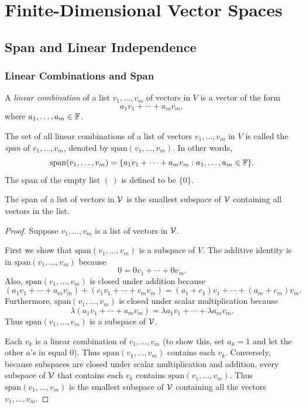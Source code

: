 \section{Finite-Dimensional Vector Spaces}

\subsection{Span and Linear Independence}
\subsubsection{Linear Combinations and Span}
\begin{definition}
	A \textit{linear combination} of a list $v_1, \dots, v_m$ of vectors in $V$ is a vector of the form
	\[
	a_1v_1 + \cdots + a_mv_m,
	\]
	where $a_1, \dots, a_m \in \mathbb{F}$.
\end{definition}
\begin{definition}[Span]
	The set of all linear combinations of a list of vectors $v_1, \dots, v_m$ in $V$ is called the \textit{span} of $v_1, \dots, v_m$, denoted by $\text{span}(v_1, \dots, v_m)$. In other words,
	\[
	\text{span}(v_1, \dots, v_m) = \{a_1v_1 + \cdots + a_mv_m : a_1, \dots, a_m \in \mathbb{F}\}.
	\]
	The span of the empty list $( \, )$ is defined to be $\{0\}$.
\end{definition}
\begin{theorem}
	The span of a list of vectors in $\mathcal{V}$ is the smallest subspace of $\mathcal{V}$ containing all vectors in the list.
\end{theorem}
\begin{proof}
	Suppose $v_1, \dots, v_m$ is a list of vectors in $\mathcal{V}$.
	
	First we show that $\text{span}(v_1, \dots, v_m)$ is a subspace of $V$. The additive identity is in $\text{span}(v_1, \dots, v_m)$ because
	\[
	0 = 0v_1 + \cdots + 0v_m.
	\]
	Also, $\text{span}(v_1, \dots, v_m)$ is closed under addition because
	\[
	(a_1v_1 + \cdots + a_mv_m) + (c_1v_1 + \cdots + c_mv_m) = (a_1 + c_1)v_1 + \cdots + (a_m + c_m)v_m.
	\]
	Furthermore, $\text{span}(v_1, \dots, v_m)$ is closed under scalar multiplication because
	\[
	\lambda(a_1v_1 + \cdots + a_mv_m) = \lambda a_1v_1 + \cdots + \lambda a_mv_m.
	\]
	Thus $\text{span}(v_1, \dots, v_m)$ is a subspace of $\mathcal{V}$.
	
	Each $v_k$ is a linear combination of $v_1, \dots, v_m$ (to show this, set $a_k = 1$ and let the other $a$'s in equal 0). Thus $\text{span}(v_1, \dots, v_m)$ contains each $v_k$. Conversely, because subspaces are closed under scalar multiplication and addition, every subspace of $\mathcal{V}$ that contains each $v_k$ contains $\text{span}(v_1, \dots, v_m)$. Thus $\text{span}(v_1, \dots, v_m)$ is the smallest subspace of $\mathcal{V}$ containing all the vectors $v_1, \dots, v_m$.
\end{proof}
